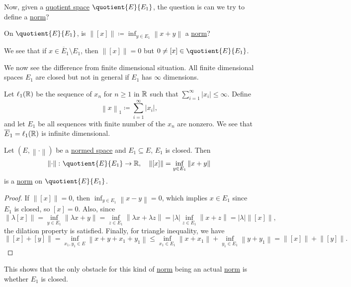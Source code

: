 Now, given a \hyperref[def:quotient-space]{quotient space} \(\quotient{E}{E_1} \), the question is can we try to define a \hyperref[def:norm]{norm}?

\begin{problem}
On \(\quotient{E}{E_1} \), is \(\left\lVert [x]\right\rVert \coloneqq \inf _{y\in E_1} \left\lVert x+y\right\rVert \) a \hyperref[def:norm]{norm}?
\end{problem}
\begin{answer}
	We see that if \(x\in \overline{E}_1 \setminus E_1 \), then \(\left\lVert [x]\right\rVert = 0\) but \(0 \neq [x]\in \quotient{E}{E_1} \).
\end{answer}

We now see the difference from finite dimensional situation. All finite dimensional spaces \(E_1\) are closed but not in general if \(E_1\) has \(\infty \) dimensions.

\begin{eg}
	Let \(\ell _1(\mathbb{\MakeUppercase{r}} )\) be the sequence of \(x_n\) for \(n \geq 1\) in \(\mathbb{\MakeUppercase{r}} \) such that \(\sum_{i=1}^{\infty} \left\vert x_i \right\vert \leq \infty\). Define
	\[
		\left\lVert x\right\rVert _1 \coloneqq \sum_{i=1}^{\infty} \left\vert x_i \right\vert ,
	\]
	and let \(E_1\) be all sequences with finite number of the \(x_n\) are nonzero. We see that \(\overline{E}_1= \ell _1(\mathbb{\MakeUppercase{r}} ) \) is infinite dimensional.
\end{eg}

\begin{proposition}
	Let \((E, \left\lVert \cdot\right\rVert)\) be a \hyperref[def:normed-vector-space]{normed space} and \(E_1\subseteq E\), \(E_1\) is closed. Then
	\[
		\left\lVert \cdot\right\rVert \colon \quotient{E}{E_1} \to \mathbb{\MakeUppercase{r}},\quad \left\lVert [x]\right\rVert = \inf _{y\in E_1} \left\lVert x+y\right\rVert
	\]
	is a \hyperref[def:norm]{norm} on \(\quotient{E}{E_1} \).
\end{proposition}
\begin{proof}
	If \(\left\lVert [x]\right\rVert = 0\), then \(\inf _{y\in E_1}\left\lVert x-y\right\rVert = 0\), which implies \(x\in E_1\) since \(E_1\) is closed, so \([x] = 0\). Also, since
	\[
		\left\lVert \lambda [x]\right\rVert = \inf _{y\in E_1}\left\lVert \lambda x + y\right\rVert = \inf _{z\in E_1}\left\lVert \lambda x + \lambda z\right\rVert = \left\vert \lambda  \right\vert \inf _{z\in E_1} \left\lVert x+z\right\rVert = \left\vert \lambda  \right\vert \left\lVert [x]\right\rVert,
	\]
	the dilation property is satisfied. Finally, for triangle inequality, we have
	\[
		\left\lVert [x] + [y]\right\rVert = \inf _{x_1, y_1 \in E} \left\lVert x+y + x_1 + y_1\right\rVert \leq \inf _{x_1\in E_1}\left\lVert x + x_1\right\rVert + \inf _{y_1\in E_1}\left\lVert y + y_1\right\rVert = \left\lVert [x]\right\rVert + \left\lVert [y]\right\rVert.
	\]
\end{proof}
\begin{remark}
	This shows that the only obstacle for this kind of \hyperref[def:norm]{norm} being an actual \hyperref[def:norm]{norm} is whether \(E_1\) is closed.
\end{remark}

